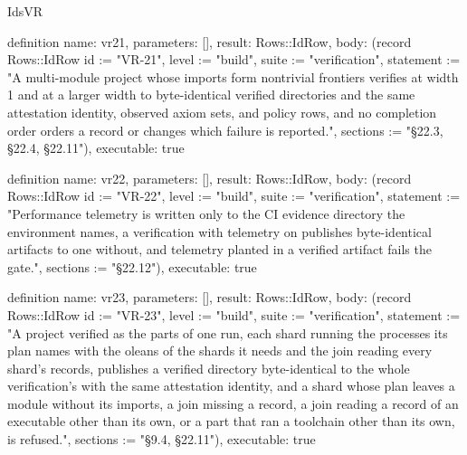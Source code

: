\begin{lexlean}{IdsVR}
\begin{semanticmodule}
definition{
  name: vr21,
  parameters: [],
  result: Rows::IdRow,
  body: (record Rows::IdRow {id := "VR-21", level := "build", suite := "verification", statement := "A multi-module project whose imports form nontrivial frontiers verifies at width 1 and at a larger width to byte-identical verified directories and the same attestation identity, observed axiom sets, and policy rows, and no completion order orders a record or changes which failure is reported.", sections := "§22.3, §22.4, §22.11"}),
  executable: true
}

definition{
  name: vr22,
  parameters: [],
  result: Rows::IdRow,
  body: (record Rows::IdRow {id := "VR-22", level := "build", suite := "verification", statement := "Performance telemetry is written only to the CI evidence directory the environment names, a verification with telemetry on publishes byte-identical artifacts to one without, and telemetry planted in a verified artifact fails the gate.", sections := "§22.12"}),
  executable: true
}

definition{
  name: vr23,
  parameters: [],
  result: Rows::IdRow,
  body: (record Rows::IdRow {id := "VR-23", level := "build", suite := "verification", statement := "A project verified as the parts of one run, each shard running the processes its plan names with the oleans of the shards it needs and the join reading every shard's records, publishes a verified directory byte-identical to the whole verification's with the same attestation identity, and a shard whose plan leaves a module without its imports, a join missing a record, a join reading a record of an executable other than its own, or a part that ran a toolchain other than its own, is refused.", sections := "§9.4, §22.11"}),
  executable: true
}
\end{semanticmodule}
\end{lexlean}
